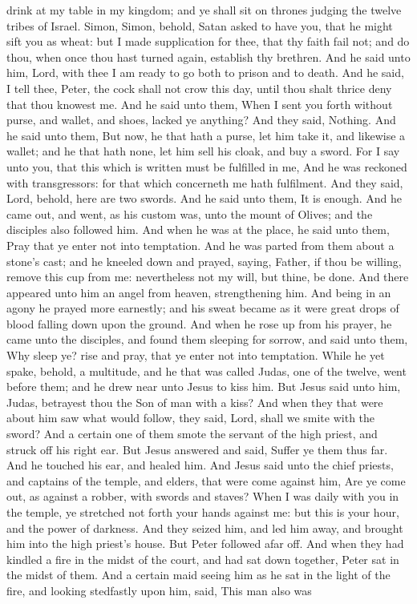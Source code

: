 drink at my table in my kingdom; and ye shall sit on thrones judging the twelve tribes of Israel.  Simon, Simon, behold, Satan asked to have you, that he might sift you as wheat: but I made supplication for thee, that thy faith fail not; and do thou, when once thou hast turned again, establish thy brethren. And he said unto him, Lord, with thee I am ready to go both to prison and to death. And he said, I tell thee, Peter, the cock shall not crow this day, until thou shalt thrice deny that thou knowest me.  And he said unto them, When I sent you forth without purse, and wallet, and shoes, lacked ye anything? And they said, Nothing. And he said unto them, But now, he that hath a purse, let him take it, and likewise a wallet; and he that hath none, let him sell his cloak, and buy a sword. For I say unto you, that this which is written must be fulfilled in me, And he was reckoned with transgressors: for that which concerneth me hath fulfilment. And they said, Lord, behold, here are two swords. And he said unto them, It is enough.  And he came out, and went, as his custom was, unto the mount of Olives; and the disciples also followed him. And when he was at the place, he said unto them, Pray that ye enter not into temptation. And he was parted from them about a stone’s cast; and he kneeled down and prayed, saying, Father, if thou be willing, remove this cup from me: nevertheless not my will, but thine, be done. And there appeared unto him an angel from heaven, strengthening him. And being in an agony he prayed more earnestly; and his sweat became as it were great drops of blood falling down upon the ground. And when he rose up from his prayer, he came unto the disciples, and found them sleeping for sorrow, and said unto them, Why sleep ye? rise and pray, that ye enter not into temptation.  While he yet spake, behold, a multitude, and he that was called Judas, one of the twelve, went before them; and he drew near unto Jesus to kiss him. But Jesus said unto him, Judas, betrayest thou the Son of man with a kiss? And when they that were about him saw what would follow, they said, Lord, shall we smite with the sword? And a certain one of them smote the servant of the high priest, and struck off his right ear. But Jesus answered and said, Suffer ye them thus far. And he touched his ear, and healed him. And Jesus said unto the chief priests, and captains of the temple, and elders, that were come against him, Are ye come out, as against a robber, with swords and staves? When I was daily with you in the temple, ye stretched not forth your hands against me: but this is your hour, and the power of darkness.  And they seized him, and led him away, and brought him into the high priest’s house. But Peter followed afar off. And when they had kindled a fire in the midst of the court, and had sat down together, Peter sat in the midst of them. And a certain maid seeing him as he sat in the light of the fire, and looking stedfastly upon him, said, This man also was 